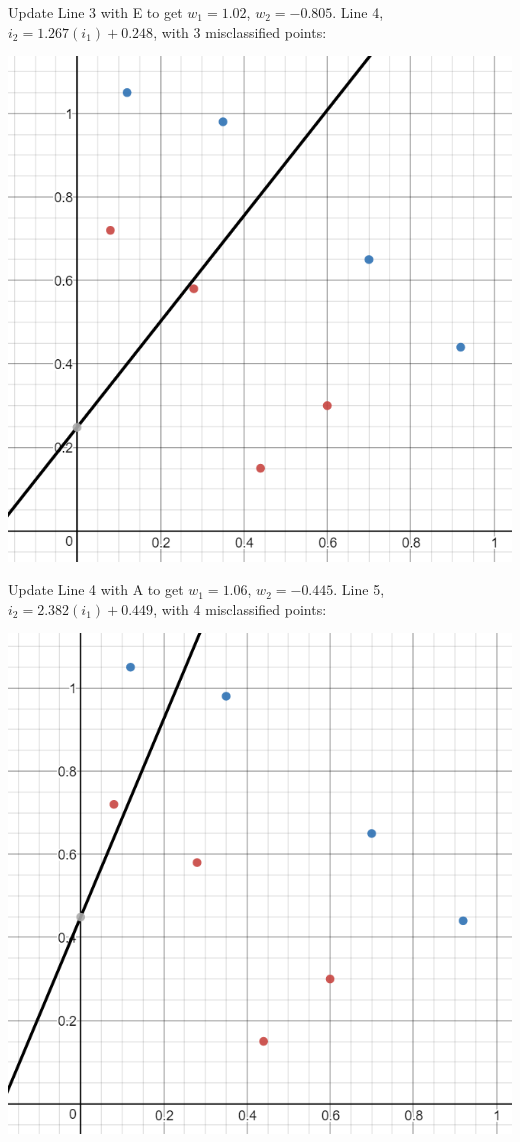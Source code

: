 \documentclass[12pt, letterpaper]{article}
\begin{document}
	\medskip 	
	Update Line 3 with E to get $w_1 = 1.02$, $w_2 = -0.805$. Line 4, $i_2 = 1.267(i_1) + 0.248$, with 3 misclassified points:
	\medskip

	\includegraphics[scale=0.6]{"Problem 4/Line 4"}
	
	\medskip 	
	Update Line 4 with A to get $w_1 = 1.06$, $w_2 = -0.445$. Line 5, $i_2 = 2.382(i_1) + 0.449$, with 4 misclassified points:
	\medskip
	
	\includegraphics[scale=0.6]{"Problem 4/Line 5"}
	
\end{document}
